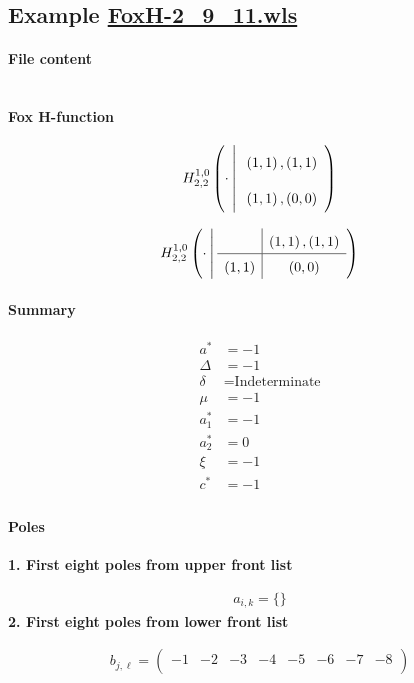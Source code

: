 \documentclass[preview]{standalone}
\begin{document}
\subsection{Example \url{FoxH-2_9_11.wls}}

\paragraph{File content}

\inputminted{text}{../Examples/FoxH-2_9_11.wls}

\paragraph{Fox H-function}

\begin{align*}
  \FoxH
    {1,0}
    {2,2}
    {\cdot}
    {\left(1, 1\right), \left(1, 1\right)}
    {\left(1, 1\right), \left(0, 0\right)}
\end{align*}

\begin{align*}
  \FoxHext
    {1,0}
    {2,2}
    {\cdot}
    {}
    {\left(1, 1\right), \left(1, 1\right)}
    {\left(1, 1\right)}
    {\left(0, 0\right)}
\end{align*}

\paragraph{Summary}

\begin{align*}
  a^*    & = -1 \\
  \Delta & = -1 \\
  \delta & = \text{Indeterminate} \\
  \mu    & = -1 \\
  a_1^*  & = -1 \\
  a_2^*  & = 0 \\
  \xi    & = -1 \\
  c^*    & = -1 \\
\end{align*}

\paragraph{Poles}

\noindent\textbf{1. First eight poles from upper front list}

\begin{align*}
  a_{i,k} = 
  \{\}
\end{align*}
\noindent\textbf{2. First eight poles from lower front list}

\begin{align*}
  b_{j,\ell} = 
  \left(
\begin{array}{cccccccc}
 -1 & -2 & -3 & -4 & -5 & -6 & -7 & -8 \\
\end{array}
\right)
\end{align*}
\end{document}
